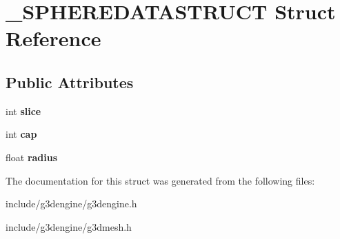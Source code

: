 \hypertarget{struct__SPHEREDATASTRUCT}{}\section{\+\_\+\+S\+P\+H\+E\+R\+E\+D\+A\+T\+A\+S\+T\+R\+U\+CT Struct Reference}
\label{struct__SPHEREDATASTRUCT}
\subsection*{Public Attributes}
\begin{DoxyCompactItemize}
\item 
\mbox{\label{struct__SPHEREDATASTRUCT_ac0a57173ca21fdab971e3aa76e8d5a5b}} 
int {\bfseries slice}
\item 
\mbox{\label{struct__SPHEREDATASTRUCT_aaaae84424cddfa5876037cccc27acc2e}} 
int {\bfseries cap}
\item 
\mbox{\label{struct__SPHEREDATASTRUCT_ae598dcaca5e1af2ffc270ae7cf2df9d8}} 
float {\bfseries radius}
\end{DoxyCompactItemize}


The documentation for this struct was generated from the following files\+:\begin{DoxyCompactItemize}
\item 
include/g3dengine/g3dengine.\+h\item 
include/g3dengine/g3dmesh.\+h\end{DoxyCompactItemize}
